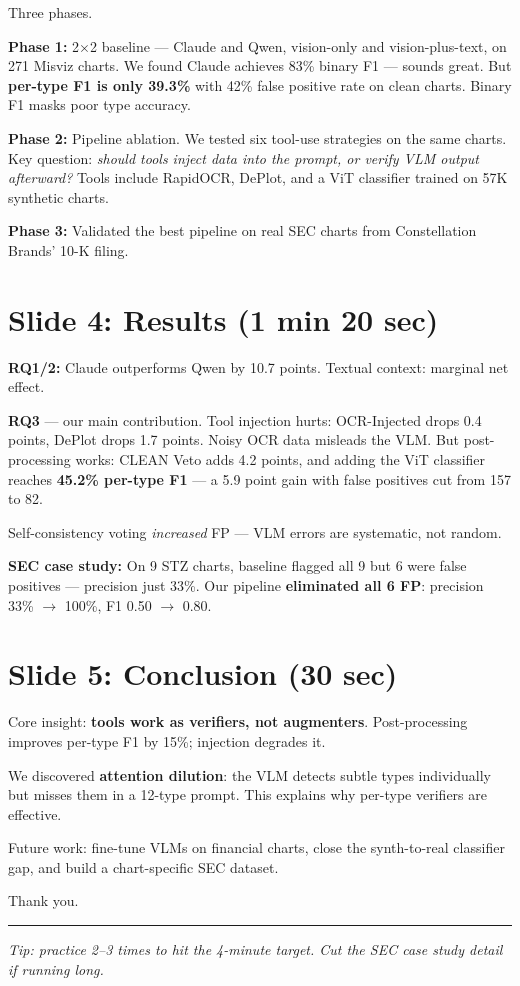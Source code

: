 \documentclass[11pt]{article}
\begin{document}
Three phases.

\textbf{Phase 1:} 2$\times$2 baseline --- Claude and Qwen, vision-only and vision-plus-text, on 271 Misviz charts. We found Claude achieves 83\% binary F1 --- sounds great. But \textcolor{dred}{\textbf{per-type F1 is only 39.3\%}} with 42\% false positive rate on clean charts. Binary F1 masks poor type accuracy.

\textbf{Phase 2:} Pipeline ablation. We tested six tool-use strategies on the same charts. Key question: \textit{should tools inject data into the prompt, or verify VLM output afterward?} Tools include RapidOCR, DePlot, and a ViT classifier trained on 57K synthetic charts.

\textbf{Phase 3:} Validated the best pipeline on real SEC charts from Constellation Brands' 10-K filing.

\section{Slide 4: Results \textnormal{\small(1 min 20 sec)}}

\textbf{RQ1/2:} Claude outperforms Qwen by 10.7 points. Textual context: marginal net effect.

\textbf{RQ3} --- our main contribution. \textcolor{dred}{Tool injection hurts}: OCR-Injected drops 0.4 points, DePlot drops 1.7 points. Noisy OCR data misleads the VLM. But \textcolor{dgreen}{post-processing works}: CLEAN Veto adds 4.2 points, and adding the ViT classifier reaches \textcolor{dgreen}{\textbf{45.2\% per-type F1}} --- a 5.9 point gain with false positives cut from 157 to 82.

Self-consistency voting \textit{increased} FP --- VLM errors are systematic, not random.

\textbf{SEC case study:} On 9 STZ charts, baseline flagged all 9 but 6 were false positives --- precision just 33\%. Our pipeline \textcolor{dgreen}{\textbf{eliminated all 6 FP}}: precision 33\% $\rightarrow$ 100\%, F1 0.50 $\rightarrow$ 0.80.

\section{Slide 5: Conclusion \textnormal{\small(30 sec)}}

Core insight: \textbf{tools work as verifiers, not augmenters}. Post-processing improves per-type F1 by 15\%; injection degrades it.

We discovered \textbf{attention dilution}: the VLM detects subtle types individually but misses them in a 12-type prompt. This explains why per-type verifiers are effective.

Future work: fine-tune VLMs on financial charts, close the synth-to-real classifier gap, and build a chart-specific SEC dataset.

Thank you.

\vspace{12pt}
\hrule
\vspace{8pt}
{\small\color{gray} \textit{Tip: practice 2--3 times to hit the 4-minute target. Cut the SEC case study detail if running long.}}
\end{document}

